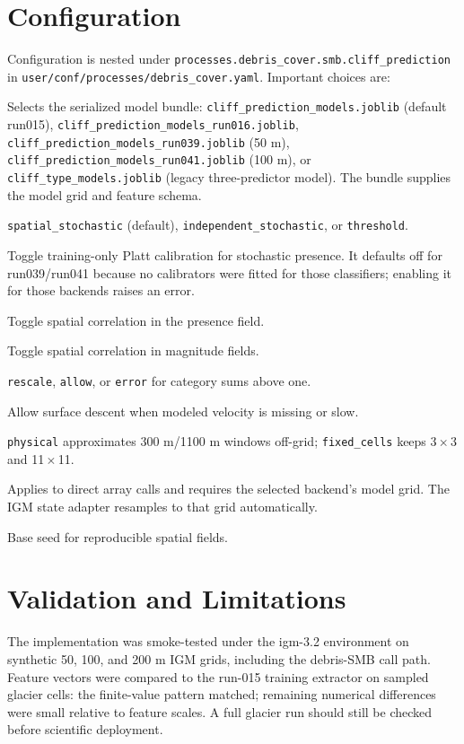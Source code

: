 \documentclass[11pt,a4paper]{article}
\begin{document}
\section{Configuration}
Configuration is nested under
\texttt{processes.debris\_cover.smb.cliff\_prediction} in
\texttt{user/conf/processes/debris\_cover.yaml}. Important choices are:
\begin{description}[style=nextline]
  \item[\texttt{model\_file}] Selects the serialized model bundle: \texttt{cliff\_prediction\_models.joblib} (default run015), \texttt{cliff\_prediction\_models\_run016.joblib}, \texttt{cliff\_prediction\_models\_run039.joblib} (50 m), \texttt{cliff\_prediction\_models\_run041.joblib} (100 m), or \texttt{cliff\_type\_models.joblib} (legacy three-predictor model). The bundle supplies the model grid and feature schema.
  \item[\texttt{presence\_mode}] \texttt{spatial\_stochastic} (default), \texttt{independent\_stochastic}, or \texttt{threshold}.
  \item[\texttt{probability\_calibration}] Toggle training-only Platt calibration for stochastic presence. It defaults off for run039/run041 because no calibrators were fitted for those classifiers; enabling it for those backends raises an error.
  \item[\texttt{presence\_spatial\_correlation}] Toggle spatial correlation in the presence field.
  \item[\texttt{fraction\_spatial\_correlation}] Toggle spatial correlation in magnitude fields.
  \item[\texttt{fraction\_sum\_policy}] \texttt{rescale}, \texttt{allow}, or \texttt{error} for category sums above one.
  \item[\texttt{allow\_surface\_slope\_fallback}] Allow surface descent when modeled velocity is missing or slow.
  \item[\texttt{window\_policy}] \texttt{physical} approximates 300 m/1100 m windows off-grid; \texttt{fixed\_cells} keeps 3\,$\times$\,3 and 11\,$\times$\,11.
  \item[\texttt{require\_100m\_grid}] Applies to direct array calls and requires the selected backend's model grid. The IGM state adapter resamples to that grid automatically.
  \item[\texttt{random\_seed}] Base seed for reproducible spatial fields.
\end{description}

\section{Validation and Limitations}
The implementation was smoke-tested under the igm-3.2 environment on synthetic
50, 100, and 200 m IGM grids, including the debris-SMB call path. Feature vectors
were compared to the run-015 training extractor on sampled glacier cells: the
finite-value pattern matched; remaining numerical differences were small
relative to feature scales. A full glacier run should still be checked before
scientific deployment.
\end{document}
